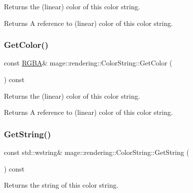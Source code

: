 Returns the (linear) color of this color string.

\begin{DoxyReturn}{Returns}
A reference to (linear) color of this color string. 
\end{DoxyReturn}
\mbox{\label{classmage_1_1rendering_1_1_color_string_a08bd67511180f15e902ce34dd402fe82}} 
\subsubsection{\texorpdfstring{Get\+Color()}{GetColor()}\hspace{0.1cm}{\footnotesize\ttfamily [2/2]}}
{\footnotesize\ttfamily const \mbox{\hyperlink{structmage_1_1_r_g_b_a}{R\+G\+BA}}\& mage\+::rendering\+::\+Color\+String\+::\+Get\+Color (\begin{DoxyParamCaption}{ }\end{DoxyParamCaption}) const\hspace{0.3cm}{\ttfamily [noexcept]}}

Returns the (linear) color of this color string.

\begin{DoxyReturn}{Returns}
A reference to (linear) color of this color string. 
\end{DoxyReturn}
\mbox{\label{classmage_1_1rendering_1_1_color_string_a953db2aabafa120aab206e1295f92992}} 
\subsubsection{\texorpdfstring{Get\+String()}{GetString()}}
{\footnotesize\ttfamily const std\+::wstring\& mage\+::rendering\+::\+Color\+String\+::\+Get\+String (\begin{DoxyParamCaption}{ }\end{DoxyParamCaption}) const\hspace{0.3cm}{\ttfamily [noexcept]}}

Returns the string of this color string.

